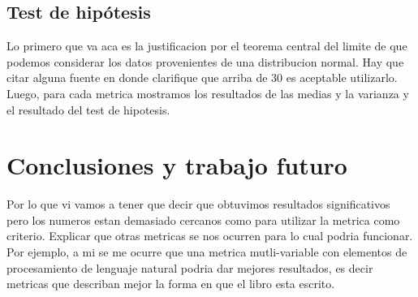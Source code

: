 \documentclass[12pt,journal,compsoc]{IEEEtran}
\begin{document}
\subsection{Test de hipótesis} Lo primero que va aca es la justificacion por el teorema central del limite de que podemos considerar los datos provenientes de una distribucion normal. Hay que citar alguna fuente en donde clarifique que arriba de 30 es aceptable utilizarlo. Luego, para cada metrica mostramos los resultados de las medias y la varianza y el resultado del test de hipotesis.

\section{Conclusiones y trabajo futuro} Por lo que vi vamos a tener que decir que obtuvimos resultados significativos pero los numeros estan demasiado cercanos como para utilizar la metrica como criterio. Explicar que otras metricas se nos ocurren para lo cual podria funcionar. Por ejemplo, a mi se me ocurre que una metrica mutli-variable con elementos de procesamiento de lenguaje natural podria dar mejores resultados, es decir metricas que describan mejor la forma en que el libro esta escrito.\\


%
\end{document}
